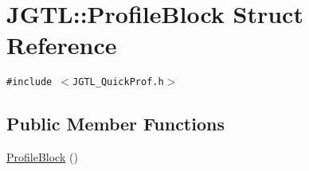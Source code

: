 \hypertarget{struct_j_g_t_l_1_1_profile_block}{
\section{JGTL::Profile\-Block Struct Reference}
\label{struct_j_g_t_l_1_1_profile_block}
}
{\tt \#include $<$JGTL\_\-Quick\-Prof.h$>$}

\subsection*{Public Member Functions}
\begin{CompactItemize}
\item 
\hyperlink{struct_j_g_t_l_1_1_profile_block_978acff6a004461d28e440472dd5d895}{Profile\-Block} ()
\end{CompactItemize}
